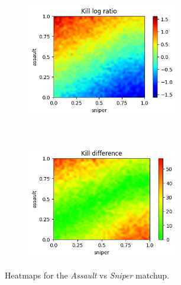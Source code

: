 \begin{figure}[H]
    \centering
    \begin{subfigure}[t]{0.5\textwidth}
        \centering
        \includegraphics[height=5cm]{Images/images/heatmaps/mid-range/assault_sniper_heatmap_ratio.png}
    \end{subfigure}%
    ~ 
    \begin{subfigure}[t]{0.5\textwidth}
        \centering
        \includegraphics[height=5cm]{Images/images/heatmaps/mid-range/assault_sniper_heatmap_diff.png}
    \end{subfigure}
    \caption{Heatmaps for the \textit{Assault} vs \textit{Sniper} matchup.}
    \label{fig:balance_assault_sniper_mid}
\end{figure}

